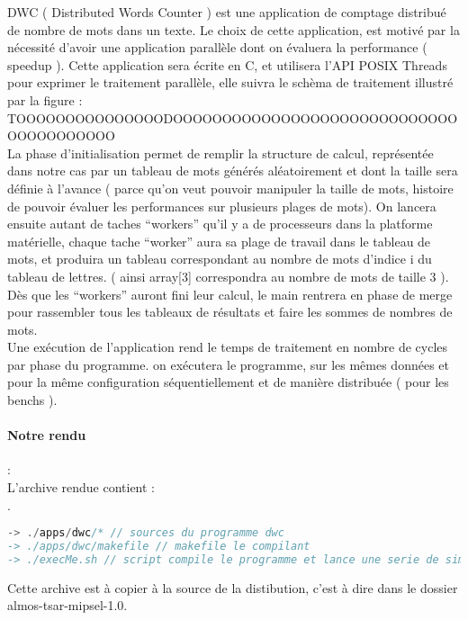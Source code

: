 DWC ( Distributed Words Counter ) est une application de comptage distribué de nombre de mots dans un texte. Le choix de cette application, est motivé par la nécessité d'avoir une application parallèle dont on évaluera la performance ( speedup ). Cette application sera écrite en C, et utilisera l'API POSIX Threads pour exprimer le traitement parallèle, elle suivra le schèma de traitement illustré par la figure :\\
TOOOOOOOOOOOOOOODOOOOOOOOOOOOOOOOOOOOOOOOOOOOOOOOOOOOOOOO\\
La phase d'initialisation permet de remplir la structure de calcul, représentée dans notre cas par un tableau de mots générés aléatoirement et dont la taille sera définie à l'avance ( parce qu'on veut pouvoir manipuler la taille de mots, histoire de pouvoir évaluer les performances sur plusieurs plages de mots). On lancera ensuite autant de taches ``workers'' qu'il y a de processeurs dans la platforme matérielle, chaque tache ``worker'' aura sa plage de travail dans le tableau de mots, et produira un tableau correspondant au nombre de mots d'indice i du tableau de lettres. ( ainsi array[3] correspondra au nombre de mots de taille 3 ). Dès que les ``workers'' auront fini leur calcul, le main rentrera en phase de merge pour rassembler tous les tableaux de résultats et faire les sommes de nombres de mots.\\

Une exécution de l'application rend le temps de traitement en nombre de cycles par phase du programme. on exécutera le programme, sur les mêmes données et pour la même configuration séquentiellement et de manière distribuée ( pour les benchs ).\\

\paragraph{Notre rendu}:\\

L'archive rendue contient :\\
.\\
\begin{DDbox}{\linewidth}
\begin{lstlisting}[language=C]
-> ./apps/dwc/* // sources du programme dwc
-> ./apps/dwc/makefile // makefile le compilant
-> ./execMe.sh // script compile le programme et lance une serie de simulations comme decrit dans le paragraphe precedant
\end{lstlisting}
\end{DDbox}
Cette archive est à copier à la source de la distibution, c'est à dire dans le dossier almos-tsar-mipsel-1.0.
